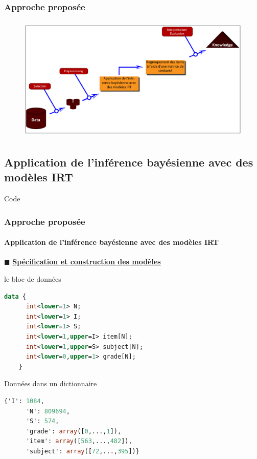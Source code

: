 \documentclass[aspectratio=169,professionalfonts, 12pt]{beamer}
\begin{document}
\begin{frame}
  \frametitle{Approche proposée}
  \justifying 
  \begin{minipage}{\textwidth}
  \begin{figure}[H]
      \includegraphics[height=6cm]{images/contribution/approch.png}
  \end{figure}
  \end{minipage}
\end{frame}

\subsection{Application de l'inférence bayésienne avec des modèles IRT}

\begin{frame}{Code}
  \frametitle{Approche proposée}
  \framesubtitle{Application de l'inférence bayésienne avec des modèles IRT}
  \(\displaystyle \blacksquare \) \textbf{\underline{Spécification et construction des modèles}}
  \begin{minipage}{0.48\textwidth}
    \begin{block}{le bloc de données}
    \begin{lstlisting}[language=Stan,basicstyle=\scriptsize,tabsize=1,framesep=0pt,framexleftmargin=0pt,xleftmargin=0pt,xrightmargin=0pt,breakindent=0pt,resetmargins=true]
    data {
      int<lower=1> N;
      int<lower=1> I;
      int<lower=1> S;
      int<lower=1,upper=I> item[N];
      int<lower=1,upper=S> subject[N];
      int<lower=0,upper=1> grade[N];
    }
    \end{lstlisting}
    \end{block}
  \end{minipage}
  \begin{minipage}{1mm}
  \hspace{1mm}
  \end{minipage}
  \begin{minipage}{0.48\textwidth}
    \begin{block}{Données dans un dictionnaire}
    \begin{lstlisting}[language=Stan,basicstyle=\scriptsize,tabsize=1,framesep=0pt,framexleftmargin=0pt,xleftmargin=0pt,xrightmargin=0pt,breakindent=0pt,resetmargins=true]
      {'I': 1084,
      'N': 809694,
      'S': 574,
      'grade': array([0,...,1]),
      'item': array([563,...,482]),
      'subject': array([72,...,395])}
      \end{lstlisting}
    \end{block}
  \end{minipage}	
\end{frame}
\end{document}
